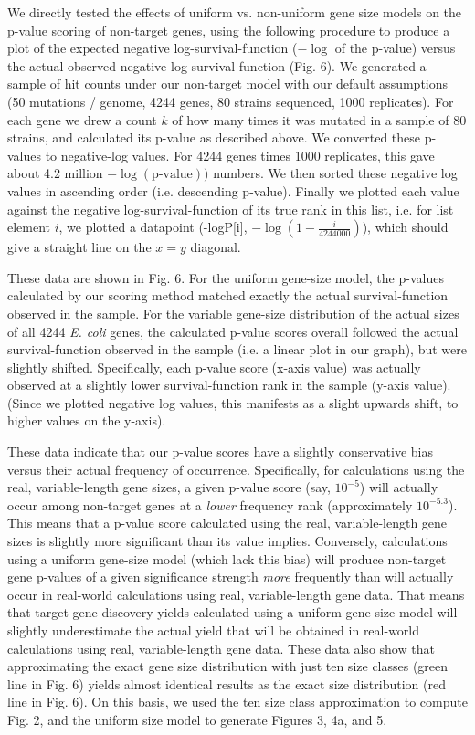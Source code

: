 \documentclass[letterpaper,10pt,english]{howto}
\begin{document}
We directly tested the effects of uniform vs. non-uniform
gene size models on the p-value scoring of non-target genes, using the
following procedure to produce a plot of
the expected negative log-survival-function ($-\log$ of the p-value)
versus the actual observed negative log-survival-function (Fig. 6).
We generated a sample of hit counts under our non-target model
with our default assumptions (50 mutations / genome, 4244 genes,
80 strains sequenced, 1000 replicates).  For each gene we drew
a count $k$ of how many times it was mutated in
a sample of 80 strains, and calculated its
p-value as described above.  We converted these p-values
to negative-log values.  For 4244 genes times 1000 replicates,
this gave about 4.2 million $-\log(\text{p-value}))$ numbers.
We then sorted these negative log values in ascending order
(i.e. descending p-value).
Finally we plotted each value against the negative
log-survival-function of its true rank in this list,
i.e. for list element $i$, we plotted a datapoint
(-logP{[}i{]}, $-\log(1-\frac{i}{4244000})$),
which should give a straight line on the $x=y$ diagonal.

These data are shown in Fig. 6.  For the uniform gene-size
model, the p-values calculated by our scoring method matched
exactly the actual survival-function observed in the sample.
For the variable gene-size distribution of the actual sizes
of all 4244 \emph{E. coli} genes, the calculated p-value scores
overall followed the actual survival-function observed in the sample
(i.e. a linear plot in our graph), but were slightly shifted.
Specifically, each p-value score (x-axis value) was actually
observed at a slightly lower survival-function rank in the sample
(y-axis value).  (Since we plotted negative log values, this
manifests as a slight upwards shift, to higher values on the
y-axis).

These data indicate that our p-value scores have a slightly
conservative bias versus their actual frequency of occurrence.
Specifically, for calculations using the real, variable-length
gene sizes, a given p-value score (say, $10^{-5}$)
will actually occur among non-target genes at a \emph{lower}
frequency rank (approximately $10^{-5.3}$).  This means
that a p-value score calculated using the real, variable-length
gene sizes is slightly more significant than its value implies.
Conversely, calculations using a uniform gene-size model
(which lack this bias) will produce non-target gene p-values
of a given significance strength \emph{more} frequently than will
actually occur in real-world calculations using real, variable-length gene
data.  That means that target gene discovery yields
calculated using a uniform gene-size model will slightly
underestimate the actual yield that will be obtained in
real-world calculations using real, variable-length gene
data.  These data also show that approximating the exact
gene size distribution with just ten size classes (green line
in Fig. 6) yields almost identical results as the exact
size distribution (red line in Fig. 6).  On this basis,
we used the ten size class approximation to compute Fig. 2,
and the uniform size model to generate Figures 3, 4a, and 5.
\end{document}
